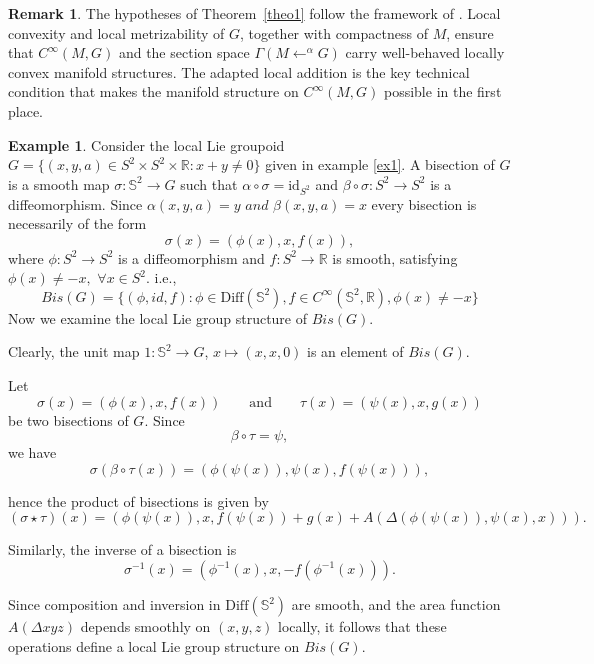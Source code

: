 \documentclass[12pt,a4paper]{amsart}
\theoremstyle{plain}
\theoremstyle{definition}
\newtheorem{Remark}[theorem]{Remark}
\newtheorem{example}[theorem]{Example}
\begin{document}
\begin{Remark}
The hypotheses of Theorem~\ref{theo1} follow the framework of \cite{Schmeding}. Local convexity and local metrizability of $G$, together with compactness of $M$, ensure that $C^\infty(M,G)$  and the section space $\Gamma(M \leftarrow^\alpha G)$  carry well-behaved locally convex manifold structures. The adapted local addition is the key technical condition that makes the manifold structure on $C^\infty(M,G)$  possible in the first place.
\end{Remark}

\begin{example}\label{ex2}
   Consider the local Lie groupoid $G=\{(x,y,a)\in S^2\times S^2\times \mathbb R:x+y\neq 0\}$ given in example \ref{ex1}.
A bisection of $G$ is a smooth map $\sigma: \mathbb{S}^{2}\rightarrow G$ such that 
$\alpha\circ\sigma=\mathrm{id}_{S^2}$ 
and $\beta\circ\sigma:S^2\to S^2$
is a diffeomorphism.
Since
$\alpha(x,y,a)=y \, \, and \,\, \beta(x,y,a)=x$
every bisection is necessarily of the form
\[
\sigma(x)=(\phi(x),x,f(x)),
\]
where
$\phi:S^2\to S^2$
is a diffeomorphism and
$f:S^2\to \mathbb R$
is smooth, satisfying
$\phi(x)\neq -x,
\,\, \forall x\in S^2$.
i.e., $$Bis(G)=\{(\phi, id, f):\phi \in \mathrm{Diff}(\mathbb{S}^{2}), f \in C^{\infty}(\mathbb{S}^{2},\mathbb{R}), \phi(x)\neq -x\}$$
Now we examine the local Lie group structure of $Bis(G)$. 

Clearly, the unit map $1: \mathbb{S}^{2} \rightarrow G$, $x\mapsto(x,x,0)$ is  an element of $Bis(G)$.

Let
\[
\sigma(x)=(\phi(x),x,f(x))
\qquad\text{and}\qquad
\tau(x)=(\psi(x),x,g(x))
\]
be two bisections of $G$. Since
\[
\beta\circ\tau=\psi,
\]
we have
\[
\sigma(\beta\circ\tau(x))
=
(\phi(\psi(x)),\psi(x),f(\psi(x))),
\]

hence the product of bisections is given by
\[
(\sigma\star\tau)(x)
=
(\phi(\psi(x)),x,
f(\psi(x))+g(x)+A(\Delta(\phi(\psi(x)),\psi(x),x))).
\]

Similarly, the inverse of a bisection is
\[
\sigma^{-1}(x)
=
(\phi^{-1}(x),x,-f(\phi^{-1}(x))).
\]

Since composition and inversion in $\mathrm{Diff}(\mathbb{S}^2)$ are smooth, and the area function
$A(\Delta xyz)$ 
depends smoothly on $(x,y,z)$ locally, it follows that these operations define a local Lie group structure on $Bis(G)$.


   
\end{example}
\end{document}
